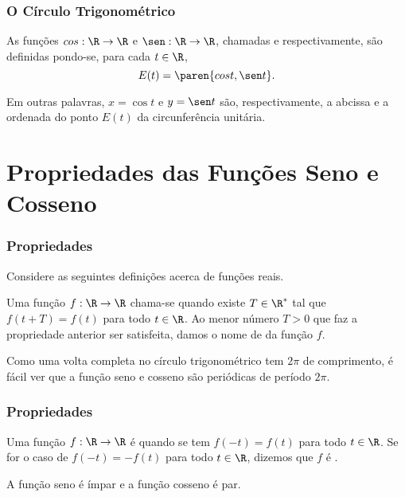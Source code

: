 \documentclass[brazil, notheorems, 10pt]{beamer}
\begin{document}

\begin{frame}
\frametitle{O Círculo Trigonométrico} %

\begin{Def}
As funções $\cos : \R \to \R$ e $\sen : \R \to \R$, chamadas
 e  respectivamente, são
definidas pondo-se, para cada $t \in \R$,
$$E(t) = \paren{\cos t , \sen t}.$$
\end{Def}
Em outras palavras, $x= \cos t$ e $y = \sen t$ são, respectivamente,
a abcissa e a ordenada do ponto $E(t)$ da circunferência unitária.

\end{frame}



\section{Propriedades das Funções Seno e Cosseno}
\begin{frame}
\frametitle{Propriedades} %


Considere as seguintes definições acerca de funções reais.

\begin{Def}
Uma função $f: \R \to \R$ chama-se  quando existe $T
\in \R^\ast$ tal que $f(t + T) = f(t)$ para todo $t \in \R$. Ao
menor número $T>0$ que faz a propriedade anterior ser satisfeita,
damos o nome de  da função $f$.
\end{Def}\pause
Como uma volta completa no círculo trigonométrico tem $2 \pi$ de
comprimento, é fácil ver que a função seno e cosseno são periódicas
de período $2\pi$.
\end{frame}

\begin{frame}
\frametitle{Propriedades} %

\begin{Def}
Uma função $f: \R \to \R$ é  quando se tem $f(-t) = f(t)$
para todo $t\in \R$. Se for o caso de $f(-t) = - f(t)$ para todo $t
\in \R$, dizemos que $f$ é .
\end{Def}\pause

\begin{Prop}
A função seno é ímpar e a função cosseno é par.
\end{Prop}


\end{frame}
\end{document}
